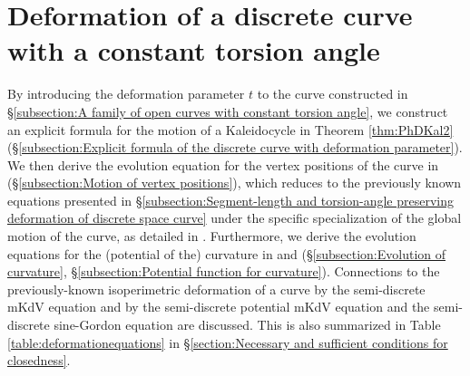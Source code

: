 \documentclass[10pt,leqno]{amsart}
\numberwithin{equation}{section}
\begin{document}
\section{Deformation of a discrete curve with a constant torsion angle}\label{section:Time evolution of curvature and its potential}
By introducing the deformation parameter $t$ to the curve constructed
in \S\ref{subsection:A family of open curves with constant torsion angle}, we construct an explicit formula for the motion of a Kaleidocycle in Theorem \ref{thm:PhDKal2} (\S\ref{subsection:Explicit formula of the discrete curve with deformation parameter}).
We then derive the evolution equation for the vertex positions of the curve in  (\S\ref{subsection:Motion of vertex positions}), which reduces to the previously known equations presented in \S\ref{subsection:Segment-length and torsion-angle preserving deformation of discrete space curve} under the specific specialization of the global motion of the curve, as detailed in .
Furthermore, we derive the evolution equations for the (potential of the) curvature in  and  (\S\ref{subsection:Evolution of curvature}, \S\ref{subsection:Potential function for curvature}).
Connections to the previously-known isoperimetric deformation of a curve by the semi-discrete mKdV equation \cite{IKMO:DmKdVsG} and by the semi-discrete potential mKdV equation and the semi-discrete sine-Gordon equation \cite{KKP:linkage} are discussed.
This is also summarized in Table \ref{table:deformationequations} in \S\ref{section:Necessary and sufficient conditions for closedness}.
\end{document}
